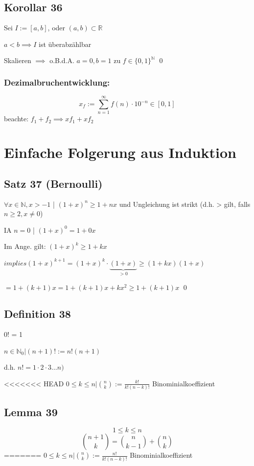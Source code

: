 \documentclass[fleqn]{scrbook}
\renewenvironment{proof}{{\bfseries Beweis }}{\qed}
\begin{document}
\subsection{Korollar 36} Sei $I := [a,b]$, oder $(a,b) \subset \mathbb{R}$

$a < b \implies I$ ist überabzählbar

\begin{proof}
Skalieren $\implies$ o.B.d.A. $a = 0, b = 1$ zu $f \in \{0,1\}^\mathbb{N}$
\end{proof}
\subsubsection{Dezimalbruchentwicklung:} \[x_f := \sum_{n = 1}^\infty f(n)  \cdot  10^{-n} \in [0,1]\]
beachte: $f_1 + f_2 \implies xf_1 + xf_2$
\section{Einfache Folgerung aus Induktion}
\subsection{Satz 37 (Bernoulli)}
$\forall x \in \mathbb{N}, x > -1$ | $(1+x)^n \geq 1 + nx$ und Ungleichung ist strikt (d.h. > gilt, falls $n \geq 2, x \neq 0$)

\begin{proof}
	IA $n = 0$ | $(1 + x)^0 = 1 + 0x$
	
	Im Ange. gilt: $(1 + x)^k \geq 1 + k x$
	
	$implies (1 + x)^{k + 1} = (1 + x)^k  \cdot  \underbrace{(1 + x)}_{> 0} \geq (1 + kx) (1 + x)$
	
	$= 1 + (k + 1)x = 1 + (k + 1)x + k x^2 \geq 1 + (k + 1)x$
\end{proof}
\subsection{Definition 38} 0! = 1

	$n \in \mathbb{N}_0 | (n + 1)! := n!(n+1)$
	
	d.h. $n! = 1  \cdot  2  \cdot  3 \ldots n)$
	
<<<<<<< HEAD
	$0 \leq k \leq n | \binom{n}{k} := \frac{k!}{k!(n-k)!}$ Binominialkoeffizient
\subsection{Lemma 39} \[1 \leq k \leq n\] \[\binom{n+1}{k} = \binom {n}{k-1} + \binom{n}{k}\]
=======
	$0 \leq k \leq n | \binom{n}{k} := \frac{n!}{k!(n-k)!}$ Binominialkoeffizient
\end{document}
